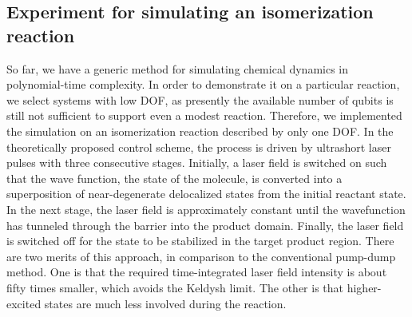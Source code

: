 \documentclass[8.5pt,twoside,twocolumn]{article}
\begin{document}
\subsection{Experiment for simulating an isomerization reaction}

So far, we have a generic method for simulating chemical dynamics
in polynomial-time complexity. In order to demonstrate it on
a particular reaction, we select systems with low DOF,
as presently the available number of qubits
is still not sufficient to support even a modest reaction.
Therefore, we implemented the simulation on an isomerization reaction
described by only one DOF.\cite{Hydrogen-Subway}
In the theoretically proposed control scheme,\cite{Hydrogen-Subway}
the process is driven by ultrashort laser pulses
with three consecutive stages. Initially, a laser field is switched on
such that the wave function, the state of the molecule,
is converted into a superposition of near-degenerate delocalized
states from the initial reactant state.
In the next stage, the laser field is approximately constant
until the wavefunction has tunneled through the barrier
into the product domain. Finally, the laser field is switched off
for the state to be stabilized in the target product region.
There are two merits of this approach, in comparison to
the conventional pump-dump method. One is that
the required time-integrated laser field intensity is about
fifty times smaller, which avoids the Keldysh limit.\cite{Keldysh_limit}
The other is that higher-excited states are much less involved
during the reaction.
\end{document}
